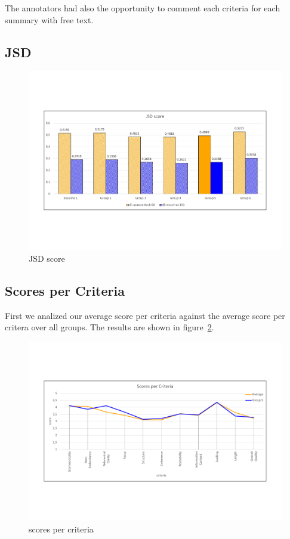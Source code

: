 The annotators had also the opportunity to comment each criteria for each summary with free text.

\subsection{JSD}

\begin{figure}[H]
	\centering
	\includegraphics[trim=0 150 0 150, width=\textwidth]{img/jsd.pdf}
	\caption{JSD score}
	\label{fig:jsd}
\end{figure}


\subsection{Scores per Criteria}

First we analized our average score per criteria against the average score per critera over all groups. The results are shown in figure~\ref{fig:spc}.

\begin{figure}[H]
	\centering
	\includegraphics[trim=0 150 0 150, width=\textwidth]{img/scores_per_criteria.pdf}
	\caption{scores per criteria}
	\label{fig:spc}
\end{figure}

